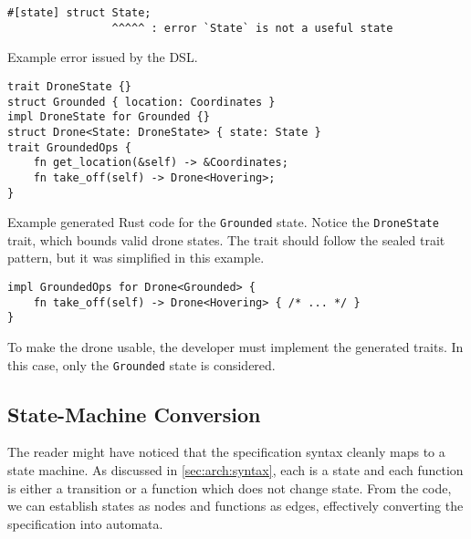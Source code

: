 \begin{listing}
    \centering
    \begin{verbatim}
#[state] struct State;
                ^^^^^ : error `State` is not a useful state
    \end{verbatim}
    \caption{
        Example error issued by the DSL.
    }
    \label{lst:dsl-typestate-error}
\end{listing}

\begin{listing}
    \centering
    \begin{verbatim}
trait DroneState {}
struct Grounded { location: Coordinates }
impl DroneState for Grounded {}
struct Drone<State: DroneState> { state: State }
trait GroundedOps {
    fn get_location(&self) -> &Coordinates;
    fn take_off(self) -> Drone<Hovering>;
}
    \end{verbatim}
    \caption{
        Example generated Rust code for the \texttt{Grounded} state.
        Notice the \texttt{DroneState} trait, which bounds valid drone states.
        The trait should follow the sealed trait pattern, but it was simplified in this example.
    }
    \label{lst:dsl-typestate-generated}
\end{listing}


\begin{listing}
    \centering
    \begin{verbatim}
impl GroundedOps for Drone<Grounded> {
    fn take_off(self) -> Drone<Hovering> { /* ... */ }
}
    \end{verbatim}
    \caption{
        To make the drone usable, the developer must implement the generated traits.
        In this case, only the \texttt{Grounded} state is considered.
    }
    \label{lst:dsl-typestate-impl}
\end{listing}

\subsection{State-Machine Conversion}
The reader might have noticed that the specification syntax cleanly maps to a state machine.
As discussed in \autoref{sec:arch:syntax}, each  is a state and each function is either a transition or a function which does not change state.
From the code, we can establish states as nodes and functions as edges,
effectively converting the specification into automata.

